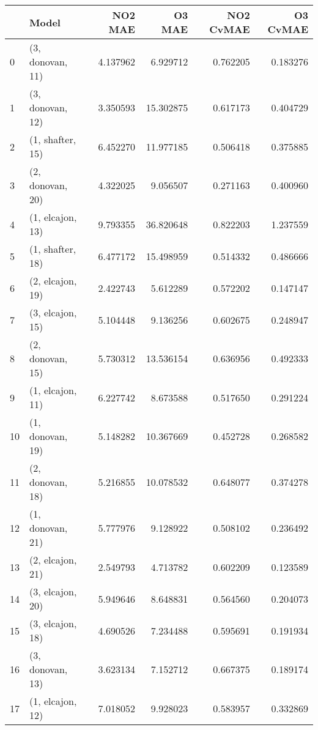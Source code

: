 \begin{tabular}{llrrrr}
\toprule
{} &             Model &   NO2 MAE &     O3 MAE &  NO2 CvMAE &  O3 CvMAE \\
\midrule
0  &  (3, donovan, 11) &  4.137962 &   6.929712 &   0.762205 &  0.183276 \\
1  &  (3, donovan, 12) &  3.350593 &  15.302875 &   0.617173 &  0.404729 \\
2  &  (1, shafter, 15) &  6.452270 &  11.977185 &   0.506418 &  0.375885 \\
3  &  (2, donovan, 20) &  4.322025 &   9.056507 &   0.271163 &  0.400960 \\
4  &  (1, elcajon, 13) &  9.793355 &  36.820648 &   0.822203 &  1.237559 \\
5  &  (1, shafter, 18) &  6.477172 &  15.498959 &   0.514332 &  0.486666 \\
6  &  (2, elcajon, 19) &  2.422743 &   5.612289 &   0.572202 &  0.147147 \\
7  &  (3, elcajon, 15) &  5.104448 &   9.136256 &   0.602675 &  0.248947 \\
8  &  (2, donovan, 15) &  5.730312 &  13.536154 &   0.636956 &  0.492333 \\
9  &  (1, elcajon, 11) &  6.227742 &   8.673588 &   0.517650 &  0.291224 \\
10 &  (1, donovan, 19) &  5.148282 &  10.367669 &   0.452728 &  0.268582 \\
11 &  (2, donovan, 18) &  5.216855 &  10.078532 &   0.648077 &  0.374278 \\
12 &  (1, donovan, 21) &  5.777976 &   9.128922 &   0.508102 &  0.236492 \\
13 &  (2, elcajon, 21) &  2.549793 &   4.713782 &   0.602209 &  0.123589 \\
14 &  (3, elcajon, 20) &  5.949646 &   8.648831 &   0.564560 &  0.204073 \\
15 &  (3, elcajon, 18) &  4.690526 &   7.234488 &   0.595691 &  0.191934 \\
16 &  (3, donovan, 13) &  3.623134 &   7.152712 &   0.667375 &  0.189174 \\
17 &  (1, elcajon, 12) &  7.018052 &   9.928023 &   0.583957 &  0.332869 \\
\bottomrule
\end{tabular}
